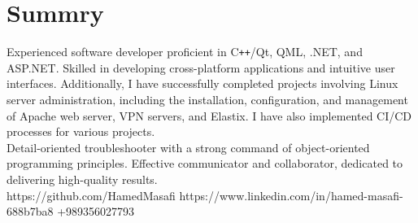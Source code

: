 \section{Summry}
Experienced software developer proficient in C\texttt{++}/Qt, QML, .NET, and ASP.NET. Skilled in developing cross-platform applications and intuitive user interfaces. Additionally, I have successfully completed projects involving Linux server administration, including the installation, configuration, and management of Apache web server, VPN servers, and Elastix. I have also implemented CI/CD processes for various projects.
\\
Detail-oriented troubleshooter with a strong command of object-oriented programming principles. Effective communicator and collaborator, dedicated to delivering high-quality results.
\\
\faGithub https://github.com/HamedMasafi
\faLinkedin https://www.linkedin.com/in/hamed-masafi-688b7ba8
\faPhone +989356027793
